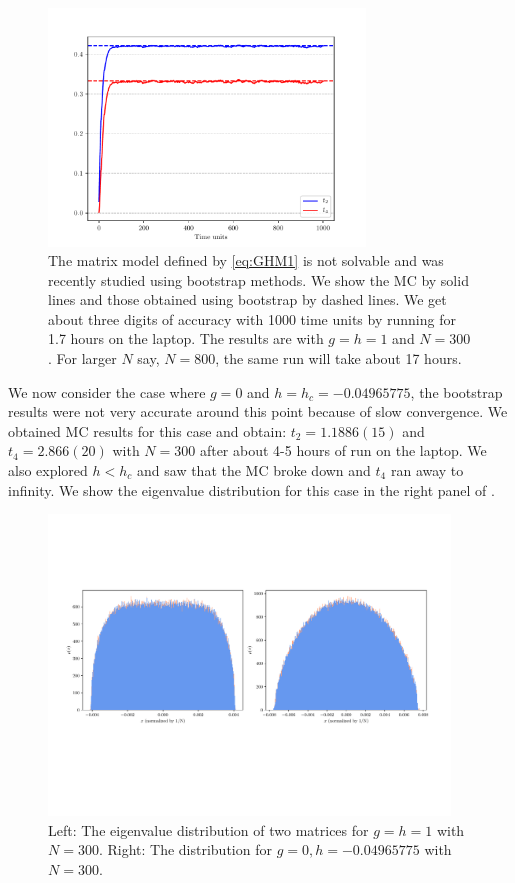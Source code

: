 \documentclass[11pt]{article}
\begin{document}
\begin{figure}[htbp] 
	\centering 
	\includegraphics[width=0.75\textwidth]{figs/plot_2MM_sym1.pdf}
	\caption{\label{fig:2MM_match}The matrix model defined by \ref{eq:GHM1} is not solvable and was 
	recently studied using bootstrap methods. We show the MC by solid lines and those obtained using bootstrap by dashed lines. We get about three digits of accuracy with 1000 time units by running for 1.7 hours on the laptop. The results are with $g=h=1$ and $N=300$. For larger $N$ say, $N=800$, the same run will take about 17 hours.}
\end{figure}


We now consider the case where $g=0$ and $h = h_{c}=-0.04965775$, the bootstrap results were not 
very accurate around this point because of slow convergence. We obtained MC results for this case 
and obtain: $t_{2} = 1.1886(15)$ and $t_{4}=2.866(20)$ with $N=300$ after about 4-5 hours of run on the
laptop. We also explored $h < h_{c}$ and saw that the MC broke down and $t_{4}$ ran away to infinity. 
We show the eigenvalue distribution for this case in the right panel of \label{fig:2MM_match1}. 


\begin{figure}[htbp] 
	\centering 
	\includegraphics[width=0.95\textwidth]{figs/plot_2MM_evd_both.pdf}
	\caption{\label{fig:2MM_match1}Left: The eigenvalue distribution of two matrices for $g=h=1$ with $N=300$.
	Right: The distribution for $g = 0, h = -0.04965775$ with $N=300$.}
\end{figure}
\end{document}
